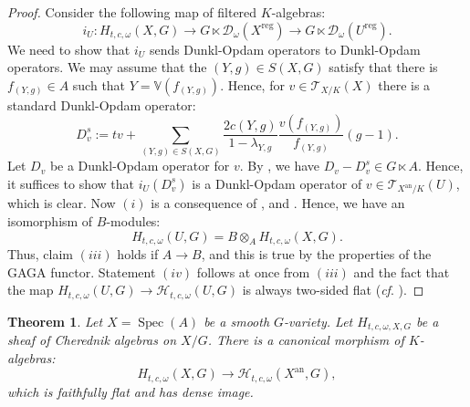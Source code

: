 \documentclass{amsart}
\newtheorem{teo}[defi]{ Theorem}
\newcommand{\D}{\mathcal{D}}
\newcommand{\Spec}{\operatorname{Spec}}
\begin{document}
\begin{proof}

Consider the following map of filtered $K$-algebras:
\begin{equation*}
    i_U:H_{t,c,\omega}(X,G)\rightarrow G\ltimes \D_{\omega}(X^{\operatorname{reg}})\rightarrow G\ltimes \D_{\omega}(U^{\operatorname{reg}}).
\end{equation*}
We need to show that $i_U$ sends Dunkl-Opdam operators to Dunkl-Opdam operators. We may assume that the $(Y,g)\in S(X,G)$ satisfy that there is  $f_{(Y,g)}\in A$ such that $Y=\mathbb{V}(f_{(Y,g)})$. Hence, for $v\in \mathcal{T}_{X/K}(X)$ there is a standard Dunkl-Opdam operator:
\begin{equation*}
    D^s_v:=tv+\sum_{(Y,g)\in S(X,G)}\frac{2c(Y,g)}{1-\lambda_{Y,g}}\frac{v(f_{(Y,g)})}{f_{(Y,g)}}(g-1).
\end{equation*}
Let $D_v$ be a Dunkl-Opdam operator for $v$. By \cite[Lemma 3.1.7]{p-adicCheralg}, we have $D_v-D^s_v\in G\ltimes A$. Hence, it suffices to show that $i_U(D^s_v)$ is a Dunkl-Opdam operator of $v\in \mathcal{T}_{X^{\operatorname{an}}/K}(U)$, which is clear. Now $(i)$ is a consequence of \cite[Theorem 2.17]{etingof2004cherednik}, and \cite[Theorem 3.3.1]{p-adicCheralg}. Hence, we have an isomorphism of $B$-modules:
\begin{equation*}
    H_{t,c,\omega}(U,G)=B\otimes_AH_{t,c,\omega}(X,G).
\end{equation*}
Thus, claim $(iii)$ holds if $A\rightarrow B$, and this is true by the properties of the GAGA functor. Statement $(iv)$ follows at once from $(iii)$ and  the fact that the map $H_{t,c,\omega}(U,G)\rightarrow \mathcal{H}_{t,c,\omega}(U,G)$ is always two-sided flat (\emph{cf}. \cite[Proposition 4.3.16]{p-adicCheralg}).
\end{proof}
\begin{teo}\label{teo faithfully flat map to analytification}
Let $X=\Spec(A)$ be a smooth $G$-variety. Let $H_{t,c,\omega,X,G}$ be a sheaf of Cherednik algebras on $X/G$. There is a canonical morphism of $K$-algebras:
\begin{equation*}
    H_{t,c,\omega}(X,G)\rightarrow \mathcal{H}_{t,c,\omega}(X^{\operatorname{an}},G),
\end{equation*}
which is faithfully flat and has dense image.
\end{teo}
\end{document}
